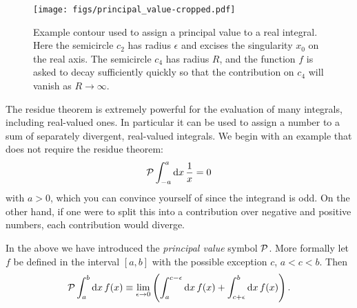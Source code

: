 \begin{figure}
\centering
\texttt{[image: figs/principal\_value-cropped.pdf]}
\caption{Example contour used to assign a principal value to a real integral.
Here the semicircle $c_2$ has radius $\epsilon$ and excises the singularity
$x_0$ on the real axis. The semicircle $c_4$ has radius $R$, and the function 
$f$ is asked to decay sufficiently quickly so that the contribution on 
$c_4$ will vanish as $R\to\infty$.}
\label{fig:principalValue}
\end{figure}

The residue theorem is extremely powerful for the evaluation of many integrals,
including real-valued ones. In particular it can be used to assign a number to
a sum of separately divergent, real-valued integrals. 
We begin with an example 
that does not require the residue theorem:
\begin{equation}\label{eq:principalEasy}
  \mathcal{P}\int_{-a}^a\dd{x}\frac{1}{x}=0
\end{equation} 
with $a>0$, which you can convince yourself of since the integrand is odd. On
the other hand, if one were to split this into a contribution over negative and
positive numbers, each contribution would diverge.

In the above we have introduced the {\it principal value}
symbol $\mathcal{P}$. More formally let $f$ be defined in the interval $[a,b]$
with the possible exception $c$, $a<c<b$. Then 
\begin{equation}
  \mathcal{P}\int_a^b\dd{x}f(x)\equiv\lim_{\epsilon\to0}
     \left(\int_a^{c-\epsilon}\dd{x}f(x)+\int_{c+\epsilon}^b\dd{x}f(x)\right).
\end{equation}

